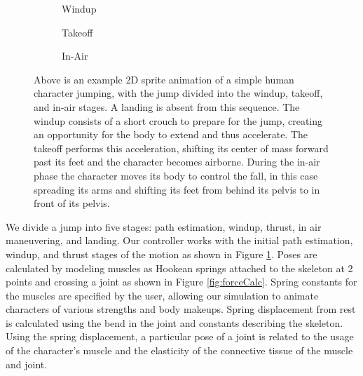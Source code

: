 \begin{figure}[htp]
	\centering
	\begin{subfigure}[h]{0.16\textwidth}
		\caption{Windup}
	\end{subfigure}
	\begin{subfigure}[h]{0.32\textwidth}
		\caption{Takeoff}
	\end{subfigure}
	\begin{subfigure}[h]{0.48\textwidth}
		\caption{In-Air}
	\end{subfigure}
	\caption[Example of stages of jumping]{Above is an example 2D sprite animation of a simple human character jumping, with the jump divided into the windup, takeoff, and in-air stages.  A landing is absent from this sequence.  The windup consists of a short crouch to prepare for the jump, creating an opportunity for the body to extend and thus accelerate.  The takeoff performs this acceleration, shifting its center of mass forward past its feet and the character becomes airborne.  During the in-air phase the character moves its body to control the fall, in this case spreading its arms and shifting its feet from behind its pelvis to in front of its pelvis.}
	\label{fig:jumpStages}
\end{figure}

We divide a jump into five stages: path estimation, windup, thrust, in air maneuvering, and landing. Our controller works with the initial path estimation, windup, and thrust stages of the motion as shown in Figure \ref{fig:jumpStages}.  Poses are  calculated by modeling muscles as Hookean springs attached to the skeleton at 2 points and crossing a joint as shown in Figure \ref{fig:forceCalc}. Spring constants for the muscles are specified by the user, allowing our simulation to animate characters of various strengths and body makeups.  Spring displacement from rest is calculated using the bend in the joint and constants describing the skeleton.  Using the spring displacement, a particular pose of a joint is related to the usage of the character's muscle and the elasticity of the connective tissue of the muscle and joint.

